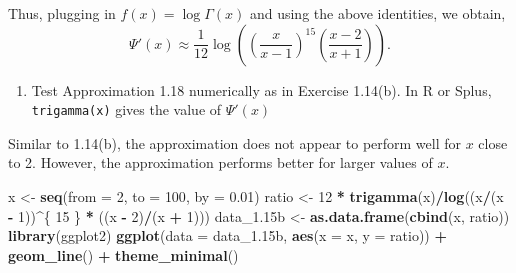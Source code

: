 \documentclass[12pt,]{article}
\newenvironment{Shaded}{\begin{snugshade}}{\end{snugshade}}
\newcommand{\DataTypeTok}[1]{\textcolor[rgb]{0.13,0.29,0.53}{#1}}
\newcommand{\DecValTok}[1]{\textcolor[rgb]{0.00,0.00,0.81}{#1}}
\newcommand{\FloatTok}[1]{\textcolor[rgb]{0.00,0.00,0.81}{#1}}
\newcommand{\KeywordTok}[1]{\textcolor[rgb]{0.13,0.29,0.53}{\textbf{#1}}}
\newcommand{\NormalTok}[1]{#1}
\newcommand{\OperatorTok}[1]{\textcolor[rgb]{0.81,0.36,0.00}{\textbf{#1}}}
\newcommand{\StringTok}[1]{\textcolor[rgb]{0.31,0.60,0.02}{#1}}
\providecommand{\tightlist}{%
  \setlength{\itemsep}{0pt}\setlength{\parskip}{0pt}}
\begin{document}
Thus, plugging in \(f(x) = \log\Gamma(x)\) and using the above
identities, we obtain,
\[\Psi'(x)\approx \frac{1}{12}\log\left(\left(\frac{x}{x-1}\right)^{15}\left(\frac{x-2}{x+1}\right)\right).\]

\begin{enumerate}
\def\labelenumi{\alph{enumi}.}
\setcounter{enumi}{1}
\tightlist
\item
  Test Approximation 1.18 numerically as in Exercise 1.14(b). In R or
  Splus, \texttt{trigamma(x)} gives the value of \(\Psi ' (x)\)
\end{enumerate}

Similar to 1.14(b), the approximation does not appear to perform well
for \(x\) close to 2. However, the approximation performs better for
larger values of \(x\).

\begin{Shaded}
\begin{Highlighting}[]
\NormalTok{x <-}\StringTok{ }\KeywordTok{seq}\NormalTok{(}\DataTypeTok{from =} \DecValTok{2}\NormalTok{, }\DataTypeTok{to =} \DecValTok{100}\NormalTok{, }\DataTypeTok{by =} \FloatTok{0.01}\NormalTok{)}
\NormalTok{ratio <-}\StringTok{ }\DecValTok{12} \OperatorTok{*}\StringTok{ }\KeywordTok{trigamma}\NormalTok{(x)}\OperatorTok{/}\KeywordTok{log}\NormalTok{((x}\OperatorTok{/}\NormalTok{(x }\OperatorTok{-}\StringTok{ }\DecValTok{1}\NormalTok{))}\OperatorTok{^}\NormalTok{\{}
    \DecValTok{15}
\NormalTok{\} }\OperatorTok{*}\StringTok{ }\NormalTok{((x }\OperatorTok{-}\StringTok{ }\DecValTok{2}\NormalTok{)}\OperatorTok{/}\NormalTok{(x }\OperatorTok{+}\StringTok{ }\DecValTok{1}\NormalTok{)))}
\NormalTok{data_}\FloatTok{1.15}\NormalTok{b <-}\StringTok{ }\KeywordTok{as.data.frame}\NormalTok{(}\KeywordTok{cbind}\NormalTok{(x, ratio))}
\KeywordTok{library}\NormalTok{(ggplot2)}
\KeywordTok{ggplot}\NormalTok{(}\DataTypeTok{data =}\NormalTok{ data_}\FloatTok{1.15}\NormalTok{b, }\KeywordTok{aes}\NormalTok{(}\DataTypeTok{x =}\NormalTok{ x, }\DataTypeTok{y =}\NormalTok{ ratio)) }\OperatorTok{+}\StringTok{ }
\StringTok{    }\KeywordTok{geom_line}\NormalTok{() }\OperatorTok{+}\StringTok{ }\KeywordTok{theme_minimal}\NormalTok{()}
\end{Highlighting}
\end{Shaded}
\end{document}
